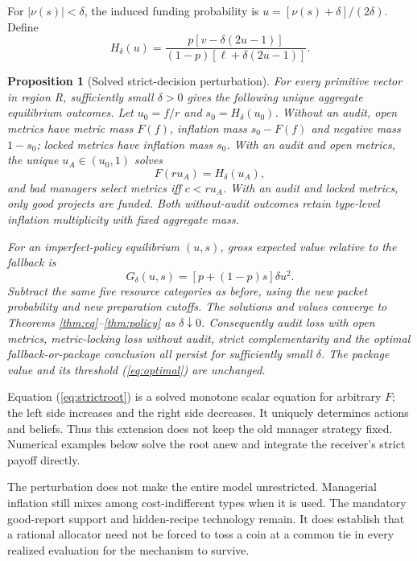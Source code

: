 \documentclass[11pt]{article}
\newtheorem{proposition}[theorem]{Proposition}
\begin{document}
For $|\nu(s)|<\delta$, the induced funding probability is $u=[\nu(s)+\delta]/(2\delta)$. Define
\begin{equation}H_\delta(u)=\frac{p[v-\delta(2u-1)]}{(1-p)[\ell+\delta(2u-1)]}.\label{eq:hdelta}\end{equation}
\begin{proposition}[Solved strict-decision perturbation]\label{prop:strict}
For every primitive vector in region R, sufficiently small $\delta>0$ gives the following unique aggregate equilibrium outcomes. Let $u_0=f/r$ and $s_0=H_\delta(u_0)$. Without an audit, open metrics have metric mass $F(f)$, inflation mass $s_0-F(f)$ and negative mass $1-s_0$; locked metrics have inflation mass $s_0$. With an audit and open metrics, the unique $u_A\in(u_0,1)$ solves
\begin{equation}F(ru_A)=H_\delta(u_A),\label{eq:strictroot}\end{equation}
and bad managers select metrics iff $c<ru_A$. With an audit and locked metrics, only good projects are funded. Both without-audit outcomes retain type-level inflation multiplicity with fixed aggregate mass.

For an imperfect-policy equilibrium $(u,s)$, gross expected value relative to the fallback is
\begin{equation}G_\delta(u,s)=[p+(1-p)s]\delta u^2.\label{eq:gdelta}\end{equation}
Subtract the same five resource categories as before, using the new packet probability and new preparation cutoffs. The solutions and values converge to Theorems \ref{thm:eq}--\ref{thm:policy} as $\delta\downarrow0$. Consequently audit loss with open metrics, metric-locking loss without audit, strict complementarity and the optimal fallback-or-package conclusion all persist for sufficiently small $\delta$. The package value and its threshold (\ref{eq:optimal}) are unchanged.
\end{proposition}
Equation (\ref{eq:strictroot}) is a solved monotone scalar equation for arbitrary $F$; the left side increases and the right side decreases. It uniquely determines actions and beliefs. Thus this extension does not keep the old manager strategy fixed. Numerical examples below solve the root anew and integrate the receiver's strict payoff directly.

The perturbation does not make the entire model unrestricted. Managerial inflation still mixes among cost-indifferent types when it is used. The mandatory good-report support and hidden-recipe technology remain. It does establish that a rational allocator need not be forced to toss a coin at a common tie in every realized evaluation for the mechanism to survive.
\end{document}
